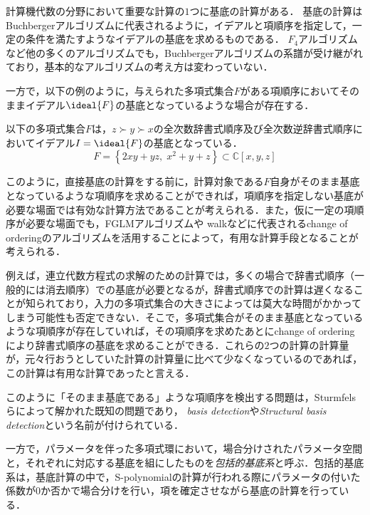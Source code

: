 
計算機代数の分野において重要な計算の$1$つに\groebner{}基底の計算がある．
\groebner{}基底の計算はBuchbergerアルゴリズム\cite{buchberger2006bruno}に代表されるように，イデアルと項順序を指定して，一定の条件を満たすようなイデアルの基底を求めるものである．
$F_4$アルゴリズム\cite{faugere1999new}など他の多くのアルゴリズムでも，Buchbergerアルゴリズムの系譜が受け継がれており，基本的なアルゴリズムの考え方は変わっていない．
\par
一方で，以下の例のように，与えられた多項式集合$F$がある項順序においてそのままイデアル$\ideal{F}$の\groebner{}基底となっているような場合が存在する．
\begin{example*}
	以下の多項式集合$F$は，$z \succ y \succ x$の全次数辞書式順序及び全次数逆辞書式順序においてイデアル$I = \ideal{F}$の\groebner{}基底となっている．
	$$F = \left\{ 2xy + yz, \; x^2 + y + z \right\} \subset \mathbb{C}[x, y, z]$$
\end{example*}
このように，直接\groebner{}基底の計算をする前に，計算対象である$F$自身がそのまま\groebner{}基底となっているような項順序を求めることができれば，項順序を指定しない\groebner{}基底が必要な場面では有効な計算方法であることが考えられる．また，仮に一定の項順序が必要な場面でも，FGLMアルゴリズム\cite{faugere1993efficient}や\groebner{} walk\cite{collart1993grobner}などに代表されるchange of orderingのアルゴリズムを活用することによって，有用な計算手段となることが考えられる．
\par
例えば，連立代数方程式の求解のための計算では，多くの場合で辞書式順序（一般的には消去順序）での\groebner{}基底が必要となるが，辞書式順序での計算は遅くなることが知られており，入力の多項式集合の大きさによっては莫大な時間がかかってしまう可能性も否定できない．そこで，多項式集合がそのまま\groebner{}基底となっているような項順序が存在していれば，その項順序を求めたあとにchange of orderingにより辞書式順序の\groebner{}基底を求めることができる．これらの$2$つの計算の計算量が，元々行おうとしていた計算の計算量に比べて少なくなっているのであれば，この計算は有用な計算であったと言える．
\par
このように「そのまま\groebner{}基底である」ような項順序を検出する問題は，Sturmfelsらによって解かれた既知の問題であり，\emph{\groebner{} basis detection}\cite{gritzmann1993minkowski}や\emph{Structural \groebner{} basis detection}\cite{sturmfels1997structural}という名前が付けられている．
\par
一方で，パラメータを伴った多項式環において，場合分けされたパラメータ空間と，それぞれに対応する\groebner{}基底を組にしたものを\emph{包括的\groebner{}基底系}\cite{weispfenning1992comprehensive}と呼ぶ．包括的\groebner{}基底系は，\groebner{}基底計算の中で，\textrm{S-polynomial}の計算が行われる際にパラメータの付いた係数が$0$か否かで場合分けを行い，項を確定させながら\groebner{}基底の計算を行っている．
